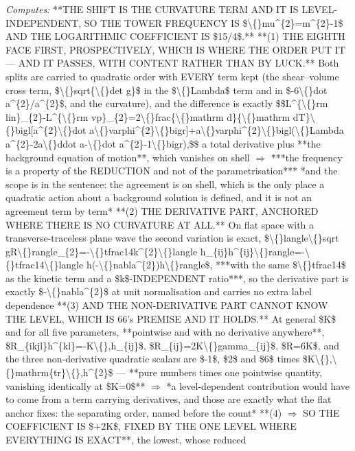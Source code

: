 \begin{description}
\emph{Computes:} **THE SHIFT IS THE CURVATURE TERM AND IT IS LEVEL-INDEPENDENT, SO THE TOWER FREQUENCY IS \$\textbackslash\{\}mu\textasciicircum{}\{2\}=m\textasciicircum{}\{2\}-1\$ AND THE LOGARITHMIC COEFFICIENT IS \$15/4\$.**  **(1)  THE EIGHTH FACE FIRST, PROSPECTIVELY, WHICH IS WHERE THE ORDER PUT IT --- AND IT PASSES, WITH CONTENT RATHER THAN BY LUCK.** Both splits are carried to quadratic order with EVERY term kept (the shear--volume cross term, \$\textbackslash\{\}sqrt\{\textbackslash\{\}det g\}\$ in the \$\textbackslash\{\}Lambda\$ term and in \$-6\textbackslash\{\}dot a\textasciicircum{}\{2\}/a\textasciicircum{}\{2\}\$, and the curvature), and the difference is exactly \$\$L\textasciicircum{}\{\textbackslash\{\}rm lin\}\_\{2\}-L\textasciicircum{}\{\textbackslash\{\}rm vp\}\_\{2\}=2\textbackslash\{\}frac\{\textbackslash\{\}mathrm d\}\{\textbackslash\{\}mathrm dT\}\textbackslash\{\}bigl[a\textasciicircum{}\{2\}\textbackslash\{\}dot a\textbackslash\{\}varphi\textasciicircum{}\{2\}\textbackslash\{\}bigr]+a\textbackslash\{\}varphi\textasciicircum{}\{2\}\textbackslash\{\}bigl(\textbackslash\{\}Lambda a\textasciicircum{}\{2\}-2a\textbackslash\{\}ddot a-\textbackslash\{\}dot a\textasciicircum{}\{2\}-1\textbackslash\{\}bigr),\$\$ a total derivative plus **the background equation of motion**, which vanishes on shell \ensuremath{\Rightarrow} ***the frequency is a property of the REDUCTION and not of the parametrisation***  *and the scope is in the sentence: the agreement is on shell, which is the only place a quadratic action about a background solution is defined, and it is not an agreement term by term*  **(2) THE DERIVATIVE PART, ANCHORED WHERE THERE IS NO CURVATURE AT ALL.** On flat space with a transverse-traceless plane wave the second variation is exact, \$\textbackslash\{\}langle\textbackslash\{\}sqrt gR\textbackslash\{\}rangle\_\{2\}=-\textbackslash\{\}tfrac14k\textasciicircum{}\{2\}\textbackslash\{\}langle h\_\{ij\}h\textasciicircum{}\{ij\}\textbackslash\{\}rangle=-\textbackslash\{\}tfrac14\textbackslash\{\}langle h(-\textbackslash\{\}nabla\textasciicircum{}\{2\})h\textbackslash\{\}rangle\$, ***with the same \$\textbackslash\{\}tfrac14\$ as the kinetic term and a \$k\$-INDEPENDENT ratio***, so the derivative part is exactly \$-\textbackslash\{\}nabla\textasciicircum{}\{2\}\$ at unit normalisation and carries no extra label dependence  **(3)  AND THE NON-DERIVATIVE PART CANNOT KNOW THE LEVEL, WHICH IS 66's PREMISE AND IT HOLDS.** At general \$K\$ and for all five parameters, **pointwise and with no derivative anywhere**, \$R\_\{ikjl\}h\textasciicircum{}\{kl\}=-K\textbackslash\{\},h\_\{ij\}\$, \$R\_\{ij\}=2K\textbackslash\{\}gamma\_\{ij\}\$, \$R=6K\$, and the three non-derivative quadratic scalars are \$-1\$, \$2\$ and \$6\$ times \$K\textbackslash\{\},\textbackslash\{\}mathrm\{tr\}\textbackslash\{\},h\textasciicircum{}\{2\}\$ --- **pure numbers times one pointwise quantity, vanishing identically at \$K=0\$** \ensuremath{\Rightarrow} *a level-dependent contribution would have to come from a term carrying derivatives, and those are exactly what the flat anchor fixes: the separating order, named before the count*  **(4) \ensuremath{\Rightarrow} SO THE COEFFICIENT IS \$+2K\$, FIXED BY THE ONE LEVEL WHERE EVERYTHING IS EXACT**, the lowest, whose reduced 
\end{description}
